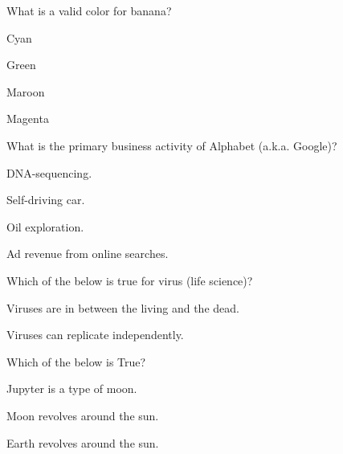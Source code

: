 \documentclass[12pt]{exam}
\begin{document}
    
\begin{questions}

    \question What is a valid color for banana?
    
        \begin{oneparchoices}
        
            \choice Cyan
        
            \choice Green
        
            \choice Maroon
        
            \choice Magenta
        
        \end{oneparchoices}

    \question What is the primary business activity of Alphabet (a.k.a. Google)?
    
        \begin{oneparchoices}
        
            \choice DNA-sequencing.
        
            \choice Self-driving car.
        
            \choice Oil exploration.
        
            \choice Ad revenue from online searches.
        
        \end{oneparchoices}

    \question Which of the below is true for virus (life science)?
    
        \begin{oneparchoices}
        
            \choice Viruses are in between the living and the dead.
        
            \choice Viruses can replicate independently.
        
        \end{oneparchoices}

    \question Which of the below is True?
    
        \begin{oneparchoices}
        
            \choice Jupyter is a type of moon.
        
            \choice Moon revolves around the sun.
        
            \choice Earth revolves around the sun.
        
        \end{oneparchoices}


\end{questions}
\end{document}
